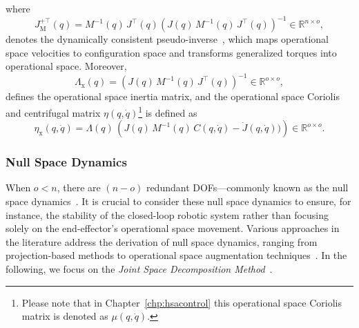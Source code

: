 where 
\begin{equation}
    J_\mathrm{M}^{+\top}(q) = M^{-1}(q) \, J^\top(q) \left ( J(q) \, M^{-1}(q) \, J^\top(q) \right )^{-1} \in \mathbb{R}^{n \times o},
\end{equation}
denotes the dynamically consistent pseudo-inverse~\citep{chang1995manipulator}, which maps operational space velocities to configuration space and transforms generalized torques into operational space. Moreover,
\begin{equation}
    \Lambda_\mathrm{x}(q) = \left ( J(q) \, M^{-1}(q) \, J^\top(q) \right )^{-1} \in \mathbb{R}^{o \times o},
\end{equation}
defines the operational space inertia matrix, and the operational space Coriolis and centrifugal matrix $\eta(q, \dot{q})$\footnote{Please note that in Chapter~\ref{chp:hsacontrol} this operational space Coriolis matrix is denoted as $\mu(q,\dot{q})$.} is defined as~\citep{khatib1987unified, della2020model}
\begin{equation}
    \eta_\mathrm{x}(q, \dot{q}) = \Lambda(q) \, \left ( J(q) \, M^{-1}(q) \, C(q,\dot{q}) - \dot{J}(q,\dot{q})) \right ) \in \mathbb{R}^{o \times o}.
\end{equation}

\subsubsection{Null Space Dynamics}
When $o < n$, there are $(n-o)$ redundant \glspl{DOF}—commonly known as the null space dynamics~\citep{siciliano2010robotics}. It is crucial to consider these null space dynamics to ensure, for instance, the stability of the closed-loop robotic system rather than focusing solely on the end-effector’s operational space movement. Various approaches in the literature address the derivation of null space dynamics, ranging from projection-based methods to operational space augmentation techniques~\citep{ott2008cartesian}. In the following, we focus on the \emph{Joint Space Decomposition Method}~\citep{ott2008cartesian}.

